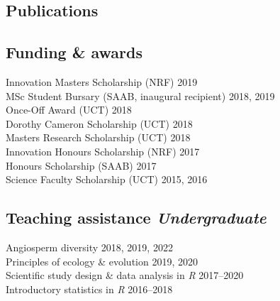 \documentclass[10pt]{article}
\begin{document}


\bigskip



\subsection*{Publications} %



\hrulefill

\begin{multicols}{2} %

\subsection*{Funding \& awards} %

Innovation Masters Scholarship     {\small  (NRF)} \hfill {\small       2019} \\
MSc Student Bursary
              {\small (SAAB, inaugural recipient)} \hfill {\small 2018, 2019} \\
Once-Off Award                     {\small  (UCT)} \hfill {\small       2018} \\
Dorothy Cameron Scholarship        {\small  (UCT)} \hfill {\small       2018} \\
Masters Research Scholarship       {\small  (UCT)} \hfill {\small       2018} \\
Innovation Honours Scholarship     {\small  (NRF)} \hfill {\small       2017} \\
Honours Scholarship                {\small (SAAB)} \hfill {\small       2017} \\
Science Faculty Scholarship        {\small  (UCT)} \hfill {\small 2015, 2016}

\subsection*{Teaching assistance %
                                \hfill {\small \textmd{\textit{Undergraduate}}}}

Angiosperm diversity                         \hfill {\small 2018, 2019, 2022} \\
Principles of ecology \& evolution           \hfill {\small       2019, 2020} \\
Scientific study design \& data analysis in \textit{R}
                                             \hfill {\small       2017--2020} \\
Introductory statistics in \textit{R} \hfill {\small 2016--2018}


\end{multicols}
\end{document}
